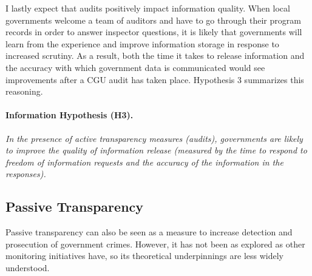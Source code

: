 \documentclass[11pt]{article}
\begin{document}
I lastly expect that audits positively impact information quality. When local governments welcome a team of auditors and have to go through their program records in order to answer inspector questions, it is likely that governments will learn from the experience and improve information storage in response to increased scrutiny. As a result, both the time it takes to release information and the accuracy with which government data is communicated would see improvements after a CGU audit has taken place. Hypothesis 3 summarizes this reasoning.

\paragraph{Information Hypothesis (H3).} \emph{In the presence of active transparency measures (audits), governments are likely to improve the quality of information release (measured by the time to respond to freedom of information requests and the accuracy of the information in the responses).}

\subsection{Passive Transparency} \label{subsec:theory2_paper3}

Passive transparency can also be seen as a measure to increase detection and prosecution of government crimes. However, it has not been as explored as other monitoring initiatives have, so its theoretical underpinnings are less widely understood.
\end{document}
